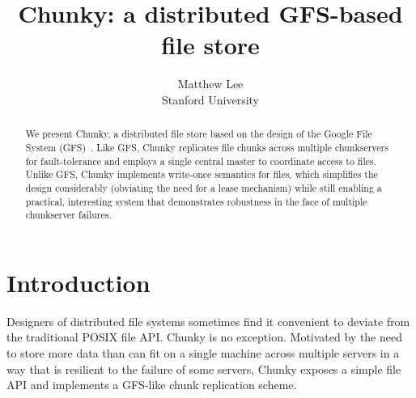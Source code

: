 \documentclass[letterpaper,twocolumn,10pt]{article}
\begin{document}

\date{}

\title{\Large \bf Chunky: a distributed GFS-based file store}

\author{
{\rm Matthew Lee}\\
Stanford University
} %

\maketitle

\begin{abstract}
  We present Chunky, a distributed file store based on the design of the Google File System (GFS)~\cite{ghemawatgobioffleung03:gfspaper}. Like GFS, Chunky replicates file chunks across multiple chunkservers for fault-tolerance and employs a single central master to coordinate access to files. Unlike GFS, Chunky implements write-once semantics for files, which simplifies the design considerably (obviating the need for a lease mechanism) while still enabling a practical, interesting system that demonstrates robustness in the face of multiple chunkserver failures.
\end{abstract}


\section{Introduction}

Designers of distributed file systems sometimes find it convenient to deviate from the traditional POSIX file API. Chunky is no exception. Motivated by the need to store more data than can fit on a single machine across multiple servers in a way that is resilient to the failure of some servers, Chunky exposes a simple file API and implements a GFS-like chunk replication scheme.

\end{document}
